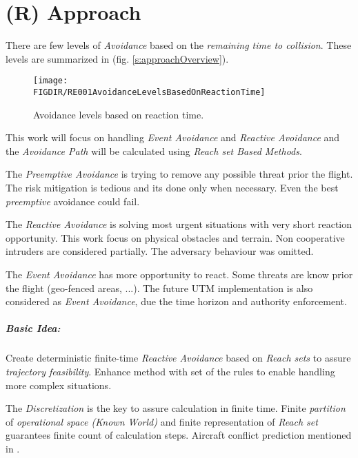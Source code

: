 \cleardoublepage
\chapter{(R) Approach}\label{ch:approach}

\noindent There are few levels of \emph{Avoidance} based on the \emph{remaining time to collision}. These levels are summarized in (fig. \ref{s:approachOverview}).

\begin{figure}[H]
    \centering
    \texttt{[image: \\FIGDIR/RE001AvoidanceLevelsBasedOnReactionTime]} 
    \caption{Avoidance levels based on reaction time.}
    \label{fig:AvoidanceLevels}
\end{figure}

This work will focus on handling \emph{Event Avoidance} and \emph{Reactive Avoidance} and the \emph{Avoidance Path} will be calculated using \emph{Reach set Based Methods}. 

The \emph{Preemptive Avoidance} is trying to remove any possible threat prior the flight. The risk mitigation is tedious and its done only when necessary. Even the best \emph{preemptive} avoidance could fail.

The \emph{Reactive Avoidance} is solving most urgent situations with very short reaction opportunity. This work focus on physical obstacles and terrain. Non cooperative intruders are considered partially. The adversary behaviour was omitted.

The \emph{Event Avoidance} has more opportunity to react. Some threats are know prior the flight (geo-fenced areas, ...). The future UTM implementation is also considered as \emph{Event Avoidance}, due the time horizon and authority enforcement. 

\paragraph{Basic Idea:} Create deterministic finite-time \emph{Reactive Avoidance} based on \emph{Reach sets} to assure \emph{trajectory feasibility}. Enhance method with set of the rules to enable handling more complex situations.

The \emph{Discretization} is the key to assure calculation in finite time. Finite \emph{partition} of \emph{operational space (Known World)} and finite representation of \emph{Reach set} guarantees finite count of calculation steps. Aircraft conflict prediction mentioned in \cite{prandini2008application}.

